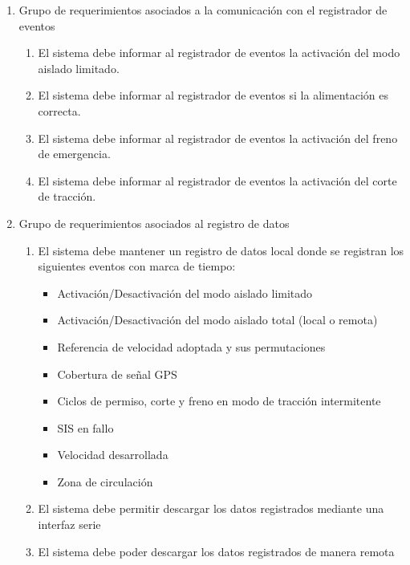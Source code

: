 \begin{enumerate}
    \item Grupo de requerimientos asociados a la comunicación con el registrador de eventos
    \begin{enumerate}
        \item El sistema debe informar al registrador de eventos la activación del modo aislado limitado.
        \item El sistema debe informar al registrador de eventos si la alimentación es correcta.
        \item El sistema debe informar al registrador de eventos la activación del freno de emergencia.
        \item El sistema debe informar al registrador de eventos la activación del corte de tracción.
    \end{enumerate}
       
    \item Grupo de requerimientos asociados al registro de datos
    \begin{enumerate}
        \item El sistema debe mantener un registro de datos local donde se registran los siguientes eventos con marca de tiempo:
        \begin{itemize}
            \item Activación/Desactivación del modo aislado limitado
            \item Activación/Desactivación del modo aislado total (local o remota)
            \item Referencia de velocidad adoptada y sus permutaciones 
            \item Cobertura de señal GPS
            \item Ciclos de permiso, corte y freno en modo de tracción intermitente
            \item SIS en fallo
            \item Velocidad desarrollada
            \item Zona de circulación
        \end{itemize}
        \item El sistema debe permitir descargar los datos registrados mediante una interfaz serie 
        \item El sistema debe poder descargar los datos registrados de manera remota 
    \end{enumerate}
       

\end{enumerate}
